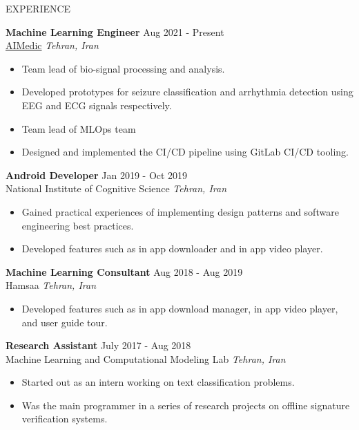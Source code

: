 \documentclass{resume} %
\begin{document}
	 \begin{rSection}{EXPERIENCE}
		
		\textbf{Machine Learning Engineer} \hfill Aug 2021 - Present\\
		\href{https://aimedic.co/}{AIMedic} \hfill \textit{Tehran, Iran}
		\begin{itemize}
			\item Team lead of bio-signal processing and analysis. 
			\item Developed prototypes for seizure classification and arrhythmia detection using EEG and ECG signals respectively.
			\item Team lead of MLOps team
			\item Designed and implemented the CI/CD pipeline using GitLab CI/CD tooling.

		\end{itemize}
		\vspace{3pt}
		\textbf{Android Developer} \hfill Jan 2019 - Oct 2019\\
		National Institute of Cognitive Science \hfill \textit{Tehran, Iran}
		\begin{itemize}
			\item Gained practical experiences of implementing design patterns and software engineering best practices.
			\item Developed features such as in app downloader and in app video player.
		\end{itemize}
		\vspace{3pt}
		\textbf{Machine Learning Consultant} \hfill Aug 2018 - Aug 2019\\
		Hamsaa \hfill \textit{Tehran, Iran}
		\begin{itemize}
			\item Developed features such as in app download manager, in app video player, and user guide tour.
		\end{itemize}
		\vspace{3pt}
		\textbf{Research Assistant} \hfill July 2017 - Aug 2018\\
		Machine Learning and Computational Modeling Lab \hfill \textit{Tehran, Iran}
		\begin{itemize}
			\item Started out as an intern working on text classification problems.
			\item Was the main programmer in a series of research projects on offline signature verification systems.
		\end{itemize}
		
	\end{rSection} 
	
\end{document}
